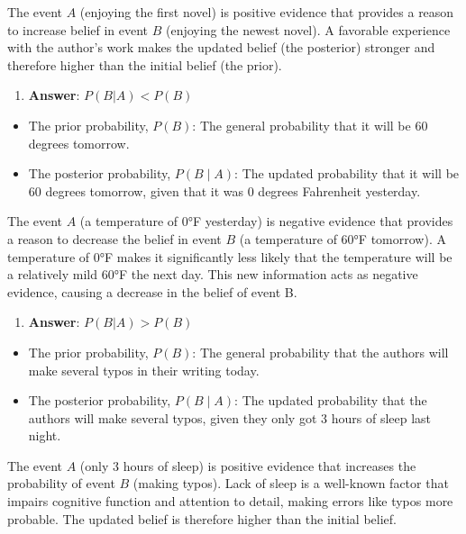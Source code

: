 \documentclass[
  letterpaper,
  DIV=11,
  numbers=noendperiod]{scrartcl}
\providecommand{\tightlist}{%
  \setlength{\itemsep}{0pt}\setlength{\parskip}{0pt}}
\theoremstyle{definition}
\theoremstyle{remark}
\begin{document}
The event \(A\) (enjoying the first novel) is positive evidence that
provides a reason to increase belief in event \(B\) (enjoying the newest
novel). A favorable experience with the author's work makes the updated
belief (the posterior) stronger and therefore higher than the initial
belief (the prior).

\begin{enumerate}
\def\labelenumi{\alph{enumi})}
\setcounter{enumi}{1}
\tightlist
\item
  \textbf{Answer}: \(P(B|A) < P(B)\)
\end{enumerate}

\begin{itemize}
\item
  The prior probability, \(P(B)\): The general probability that it will
  be 60 degrees tomorrow.
\item
  The posterior probability, \(P(B∣A)\): The updated probability that it
  will be 60 degrees tomorrow, given that it was 0 degrees Fahrenheit
  yesterday.
\end{itemize}

The event \(A\) (a temperature of 0°F yesterday) is negative evidence
that provides a reason to decrease the belief in event \(B\) (a
temperature of 60°F tomorrow). A temperature of 0°F makes it
significantly less likely that the temperature will be a relatively mild
60°F the next day. This new information acts as negative evidence,
causing a decrease in the belief of event B.

\begin{enumerate}
\def\labelenumi{\alph{enumi})}
\setcounter{enumi}{2}
\tightlist
\item
  \textbf{Answer}: \(P(B|A) > P(B)\)
\end{enumerate}

\begin{itemize}
\item
  The prior probability, \(P(B)\): The general probability that the
  authors will make several typos in their writing today.
\item
  The posterior probability, \(P(B∣A)\): The updated probability that
  the authors will make several typos, given they only got 3 hours of
  sleep last night.
\end{itemize}

The event \(A\) (only 3 hours of sleep) is positive evidence that
increases the probability of event \(B\) (making typos). Lack of sleep
is a well-known factor that impairs cognitive function and attention to
detail, making errors like typos more probable. The updated belief is
therefore higher than the initial belief.
\end{document}
